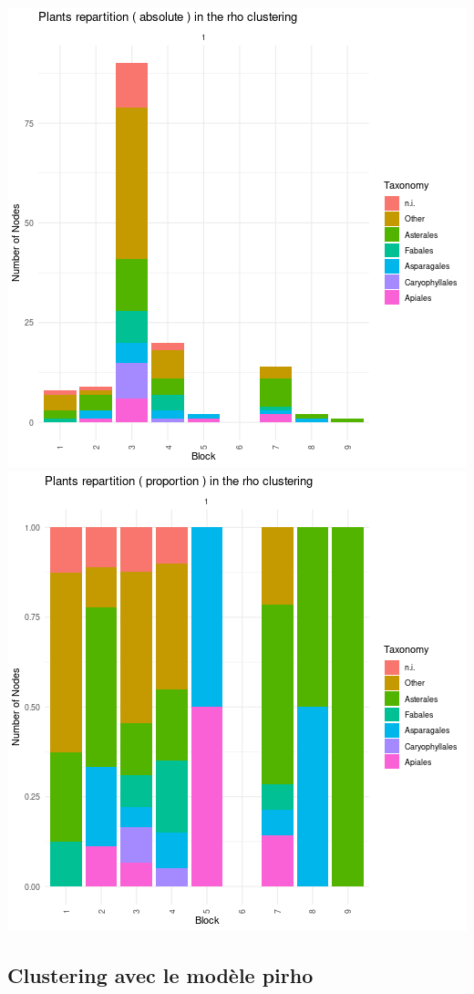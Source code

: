 \includegraphics{figure/rho_plot_taxonomy_plants-1.png}\includegraphics{figure/rho_plot_taxonomy_plants-2.png}

\hypertarget{clustering-avec-le-moduxe8le-pirho}{%
\subsection{Clustering avec le modèle
pirho}\label{clustering-avec-le-moduxe8le-pirho}}

